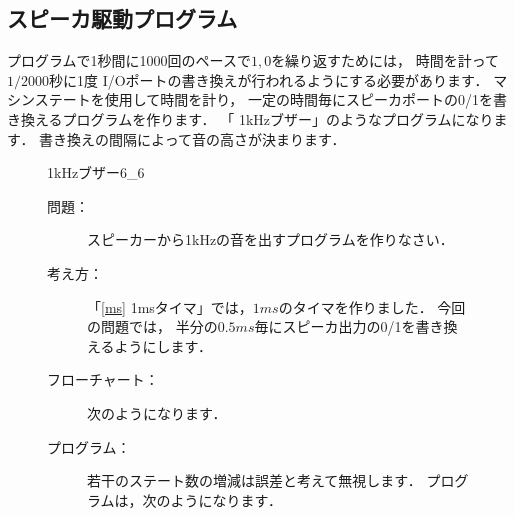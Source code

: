 
\subsection{スピーカ駆動プログラム}
プログラムで1秒間に1000回のペースで$1,0$を繰り返すためには，
時間を計って$1/2000$秒に1度
I/Oポートの書き換えが行われるようにする必要があります．
マシンステートを使用して時間を計り，
一定の時間毎にスピーカポートの0/1を書き換えるプログラムを作ります．
「 1kHzブザー」のようなプログラムになります．
書き換えの間隔によって音の高さが決まります．

\begin{figure}[btp]
\begin{reidai}{1kHzブザー}{6_6}{\small
\begin{description}
\item[問題：] 
スピーカーから1kHzの音を出すプログラムを作りなさい．

\item[考え方：]
「\ref{ms} 1msタイマ」では，$1ms$のタイマを作りました．
今回の問題では，
半分の$0.5ms$毎にスピーカ出力の0/1を書き換えるようにします．

\item[フローチャート：]
次のようになります．

\begin{center}
\end{center}

\item[プログラム：]
若干のステート数の増減は誤差と考えて無視します．
プログラムは，次のようになります．

\end{description}

}
\end{reidai}
\end{figure}
